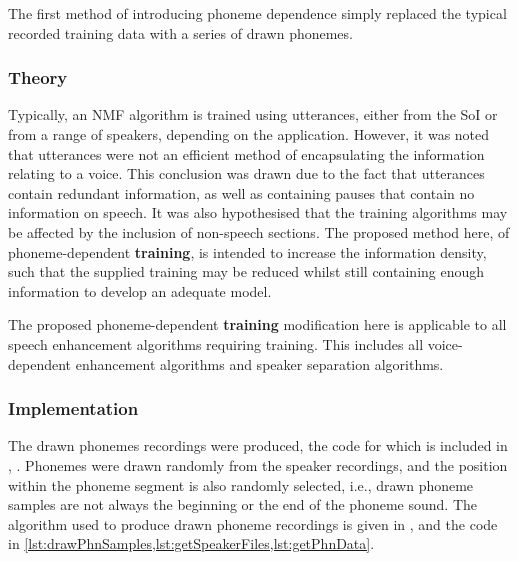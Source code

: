 The first method of introducing phoneme dependence simply replaced
the typical recorded training data with a series of drawn phonemes.


\subsubsection*{Theory}

Typically, an \ac{NMF} algorithm is trained using utterances, either
from the \ac{SoI} or from a range of speakers, depending on the application.
However, it was noted that utterances were not an efficient method
of encapsulating the information relating to a voice. This conclusion
was drawn due to the fact that utterances contain redundant information,
as well as containing pauses that contain no information on speech.
It was also hypothesised that the training algorithms may be affected
by the inclusion of non-speech sections. The proposed method here,
of phoneme-dependent\textbf{ training}, is intended to increase the
information density, such that the supplied training may be reduced
whilst still containing enough information to develop an adequate
model.

The proposed phoneme-dependent\textbf{ training} modification here
is applicable to all speech enhancement algorithms requiring training.
This includes all voice-dependent enhancement algorithms and speaker
separation algorithms.


\subsubsection*{Implementation}

The drawn phonemes recordings were produced, the code for which is
included in , \textit{}.
Phonemes were drawn randomly from the speaker recordings, and the
position within the phoneme segment is also randomly selected, i.e.,
drawn phoneme samples are not always the beginning or the end of the
phoneme sound. The algorithm used to produce drawn phoneme recordings
is given in , and the code in
\cref{lst:drawPhnSamples,lst:getSpeakerFiles,lst:getPhnData}.

